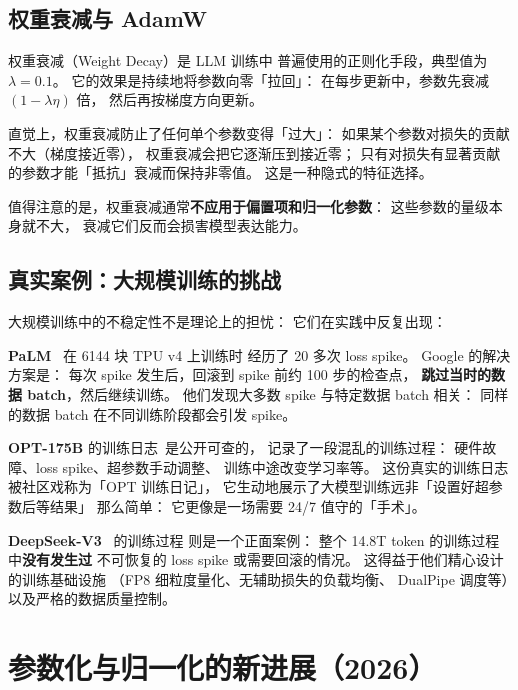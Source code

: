 \subsection{权重衰减与 AdamW}

权重衰减（Weight Decay）是 LLM 训练中
普遍使用的正则化手段，典型值为 $\lambda = 0.1$。
它的效果是持续地将参数向零「拉回」：
在每步更新中，参数先衰减 $(1 - \lambda \eta)$ 倍，
然后再按梯度方向更新。

直觉上，权重衰减防止了任何单个参数变得「过大」：
如果某个参数对损失的贡献不大（梯度接近零），
权重衰减会把它逐渐压到接近零；
只有对损失有显著贡献的参数才能「抵抗」衰减而保持非零值。
这是一种隐式的特征选择。

值得注意的是，权重衰减通常\textbf{不应用于偏置项和归一化参数}：
这些参数的量级本身就不大，
衰减它们反而会损害模型表达能力。

\subsection{真实案例：大规模训练的挑战}

大规模训练中的不稳定性不是理论上的担忧：
它们在实践中反复出现：

\textbf{PaLM}~\cite{chowdhery2022palm} 在 6144 块 TPU v4 上训练时
经历了 20 多次 loss spike。
Google 的解决方案是：
每次 spike 发生后，回滚到 spike 前约 100 步的检查点，
\textbf{跳过当时的数据 batch}，然后继续训练。
他们发现大多数 spike 与特定数据 batch 相关：
同样的数据 batch 在不同训练阶段都会引发 spike。

\textbf{OPT-175B} 的训练日志~是公开可查的，%
记录了一段混乱的训练过程：
硬件故障、loss spike、超参数手动调整、
训练中途改变学习率等。
这份真实的训练日志被社区戏称为「OPT 训练日记」，
它生动地展示了大模型训练远非「设置好超参数后等结果」
那么简单：
它更像是一场需要 24/7 值守的「手术」。

\textbf{DeepSeek-V3}~\cite{deepseekv3} 的训练过程
则是一个正面案例：
整个 14.8T token 的训练过程中\textbf{没有发生过}
不可恢复的 loss spike 或需要回滚的情况。
这得益于他们精心设计的训练基础设施
（FP8 细粒度量化、无辅助损失的负载均衡、
DualPipe 调度等）以及严格的数据质量控制。

\section{参数化与归一化的新进展（2026）}
\label{sec:parameterization-2026}

